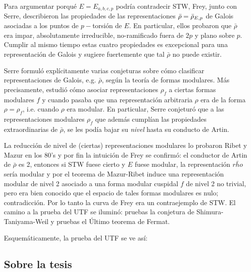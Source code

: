 \documentclass[../../tesis_maestria]{subfiles}
\begin{document}
Para argumentar porqu\'e $E=E_{a,b,c,p}$ podr\'ia contradecir STW, Frey, junto con Serre, describieron
las propiedades de las representaciones $\bar{\rho}=\bar{\rho}_{E,p}$ de Galois asociadas a los puntos de
$p-$torsi\'on de $E$. En particular, ellos probaron que $\bar{\rho}$ era impar, absolutamente
irreducible, no-ramificado fuera de $2p$ y plano sobre $p$. Cumplir al mismo tiempo estas
cuatro propiedades es excepcional para una representaci\'on de Galois y sugiere fuertemente que
tal $\bar{\rho}$ no puede existir.

Serre formul\'o expl\'icitamente varias conjeturas sobre c\'omo clasificar representaciones
de Galois, e.g. $\bar{\rho}$, seg\'un la teor\'ia de formas modulares. M\'as precisamente,
estudi\'o c\'omo asociar representaciones $\rho_f$ a ciertas formas modulares $f$ y cuando
pasaba que una representaci\'on arbitraria $\rho$ era de la forma $\rho=\rho_f$, i.e. cuando
$\rho$ era modular. En particular, Serre conjetur\'o que a las representaciones modulares $\rho_f$
que adem\'as cumpl\'ian las propiedades extraordinarias de $\bar{\rho}$, se les pod\'ia bajar su
\emph{nivel} hasta su conducto de Artin.

La reducci\'on de nivel de (ciertas) representaciones modulares lo probaron Ribet y Mazur en los
80's y por fin la intuici\'on de Frey se confirm\'o: el conductor de Artin de $\bar{\rho}$ es 2,
entonces si STW fuese cierto y $E$ fuese modular, la representaci\'on $\bar{rho}$ ser\'ia modular
y por el teorema de Mazur-Ribet induce una representaci\'on modular de nivel 2 asociado a una
forma modular cuspidal $f$ de nivel 2 no trivial, pero era bien conocido que el espacio de
tales formas modulares es nulo; contradicci\'on. Por lo tanto la curva de Frey era un
contraejemplo de STW. El camino a la prueba del UTF se ilumin\'o: pruebas la conjetura de
Shimura-Taniyama-Weil y pruebas el \'Ultimo teorema de Fermat.

Esquem\'aticamente, la prueba del UTF se ve as\'i:\\


\begingroup
\centering

\endgroup

\subsection*{Sobre la tesis}





\begingroup
\centering

\endgroup
\end{document}
